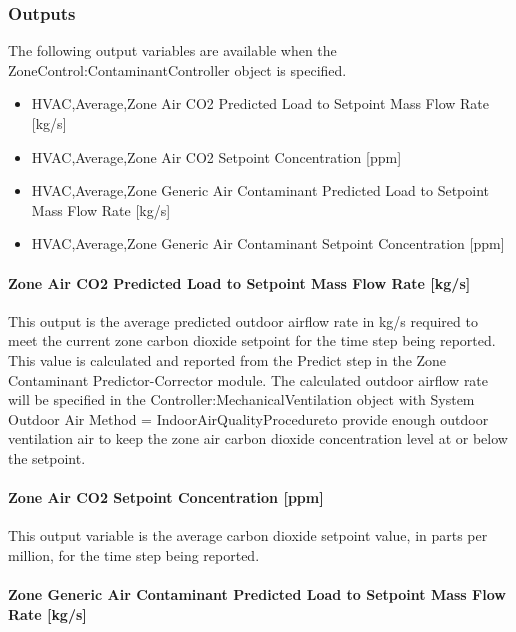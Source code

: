 \subsubsection{Outputs}\label{outputs-4-020}

The following output variables are available when the ZoneControl:ContaminantController object is specified.

\begin{itemize}
\item
  HVAC,Average,Zone Air CO2 Predicted Load to Setpoint Mass Flow Rate {[}kg/s{]}
\item
  HVAC,Average,Zone Air CO2 Setpoint Concentration {[}ppm{]}
\item
  HVAC,Average,Zone Generic Air Contaminant Predicted Load to Setpoint Mass Flow Rate {[}kg/s{]}
\item
  HVAC,Average,Zone Generic Air Contaminant Setpoint Concentration {[}ppm{]}
\end{itemize}

\paragraph{Zone Air CO2 Predicted Load to Setpoint Mass Flow Rate {[}kg/s{]}}\label{zone-air-co2-predicted-load-to-setpoint-mass-flow-rate-kgs}

This output is the average predicted outdoor airflow rate in kg/s required to meet the current zone carbon dioxide setpoint for the time step being reported. This value is calculated and reported from the Predict step in the Zone Contaminant Predictor-Corrector module. The calculated outdoor airflow rate will be specified in the Controller:MechanicalVentilation object with System Outdoor Air Method = IndoorAirQualityProcedureto provide enough outdoor ventilation air to keep the zone air carbon dioxide concentration level at or below the setpoint.

\paragraph{Zone Air CO2 Setpoint Concentration {[}ppm{]}}\label{zone-air-co2-setpoint-concentration-ppm}

This output variable is the average carbon dioxide setpoint value, in parts per million, for the time step being reported.

\paragraph{Zone Generic Air Contaminant Predicted Load to Setpoint Mass Flow Rate {[}kg/s{]}}\label{zone-generic-air-contaminant-predicted-load-to-setpoint-mass-flow-rate-kgs}

